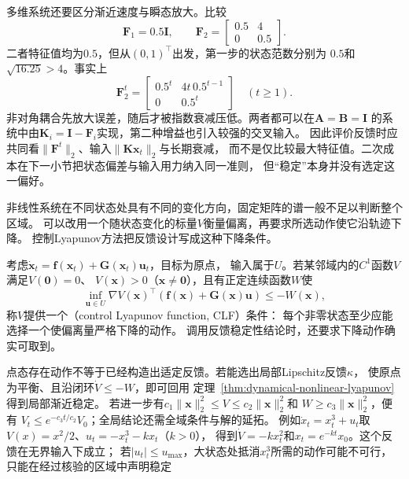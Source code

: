 多维系统还要区分渐近速度与瞬态放大。比较
\[
  \bm F_1=0.5\bm I,\qquad
  \bm F_2=\begin{bmatrix}0.5&4\\0&0.5\end{bmatrix}.
\]
二者特征值均为$0.5$，但从$(0,1)^\top$出发，第一步的状态范数分别为
$0.5$和$\sqrt{16.25}>4$。事实上
\[
  \bm F_2^t=
  \begin{bmatrix}0.5^t&4t\,0.5^{t-1}\\0&0.5^t\end{bmatrix}
  \quad(t\geq1).
\]
非对角耦合先放大误差，随后才被指数衰减压低。两者都可以在$\bm A=\bm B=\bm I$
的系统中由$\bm K_i=\bm I-\bm F_i$实现，第二种增益也引入较强的交叉输入。
因此评价反馈时应共同看$\|\bm F^t\|_2$、输入$\|\bm K\bm x_t\|_2$与长期衰减，
而不是仅比较最大特征值。二次成本在下一小节把状态偏差与输入用力纳入同一准则，
但“稳定”本身并没有选定这一偏好。

非线性系统在不同状态处具有不同的变化方向，固定矩阵的谱一般不足以判断整个区域。
可以改用一个随状态变化的标量$V$衡量偏离，再要求所选动作使它沿轨迹下降。
控制Lyapunov方法把反馈设计写成这种下降条件。
\begin{definition}[控制Lyapunov函数接口]
\label{def:control-clf}
考虑$\dot{\bm x}_t=\bm f(\bm x_t)+\bm G(\bm x_t)\bm u_t$，目标为原点，
输入属于$U$。若某邻域内的$C^1$函数$V$满足$V(\bm0)=0$、
$V(\bm x)>0$（$\bm x\neq\bm0$），且有正定连续函数$W$使
\[
  \inf_{\bm u\in U}
  \nabla V(\bm x)^\top(\bm f(\bm x)+\bm G(\bm x)\bm u)
  \leq-W(\bm x),
\]
称$V$提供一个（control Lyapunov function, CLF）条件：
每个非零状态至少应能选择一个使偏离量严格下降的动作。
调用反馈稳定性结论时，还要求下降动作确实可取到。
\end{definition}

点态存在动作不等于已经构造出适定反馈。若能选出局部Lipschitz反馈$\kappa$，
使原点为平衡、且沿闭环$\dot V\leq-W$，即可回用
定理~\ref{thm:dynamical-nonlinear-lyapunov}得到局部渐近稳定。
若进一步有$c_1\|\bm x\|_2^2\leq V\leq c_2\|\bm x\|_2^2$和
$W\geq c_3\|\bm x\|_2^2$，便有
$V_t\leq e^{-c_3t/c_2}V_0$；全局结论还需全域条件与解的延拓。
例如$\dot x_t=x_t^3+u_t$取$V(x)=x^2/2$、$u_t=-x_t^3-kx_t$（$k>0$），
得到$\dot V=-kx_t^2$和$x_t=e^{-kt}x_0$。这个反馈在无界输入下成立；
若$|u_t|\leq u_{\max}$，大状态处抵消$x_t^3$所需的动作可能不可行，
只能在经过核验的区域中声明稳定

